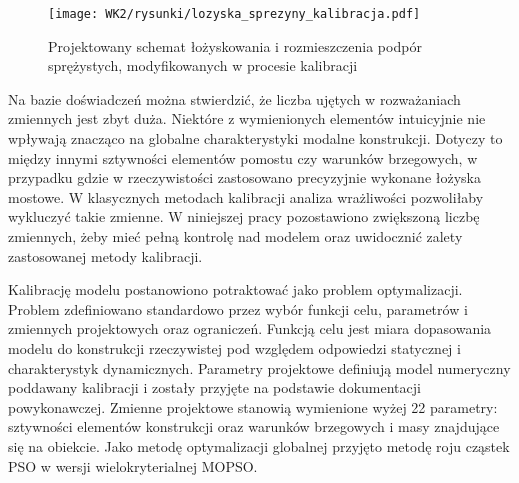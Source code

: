 \begin{figure}[hbt!]
	\centering
	\texttt{[image: WK2/rysunki/lozyska\_sprezyny\_kalibracja.pdf]}
	\captionsetup{justification=centering}
	\caption{Projektowany schemat łożyskowania i rozmieszczenia podpór sprężystych, modyfikowanych w procesie kalibracji}
	\label{fig:boudary_conditions_stiff_bearings}
\end{figure}
Na bazie doświadczeń można stwierdzić, że liczba ujętych w rozważaniach zmiennych jest zbyt duża. Niektóre z wymienionych elementów intuicyjnie nie wpływają znacząco na globalne charakterystyki modalne konstrukcji. Dotyczy to między innymi sztywności elementów pomostu czy warunków brzegowych, w przypadku gdzie w rzeczywistości zastosowano precyzyjnie wykonane łożyska mostowe. W klasycznych metodach kalibracji analiza wrażliwości pozwoliłaby wykluczyć takie zmienne. W niniejszej pracy pozostawiono zwiększoną liczbę zmiennych, żeby mieć pełną kontrolę nad modelem oraz uwidocznić zalety zastosowanej metody kalibracji.

Kalibrację modelu postanowiono potraktować jako problem optymalizacji. Problem zdefiniowano standardowo przez wybór funkcji celu, parametrów i zmiennych projektowych oraz ograniczeń. Funkcją celu jest miara dopasowania modelu do konstrukcji rzeczywistej pod względem odpowiedzi statycznej i charakterystyk dynamicznych. Parametry projektowe definiują model numeryczny poddawany kalibracji i zostały przyjęte na podstawie dokumentacji powykonawczej. Zmienne projektowe stanowią wymienione wyżej 22 parametry: sztywności elementów konstrukcji oraz warunków brzegowych i masy znajdujące się na obiekcie. Jako metodę optymalizacji globalnej przyjęto metodę roju cząstek PSO w wersji wielokryterialnej MOPSO. 

